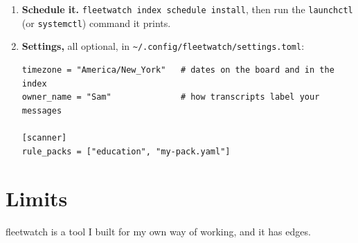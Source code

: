 \documentclass[11pt, letterpaper]{article}
\newenvironment{code}{\par\smallskip\small}{\par\smallskip}
\newcommand{\cmd}[1]{\texttt{#1}}
\begin{document}
\begin{enumerate}
    The first \cmd{index add} creates the registry with its group. A second group is declared
    by hand, in \cmd{\textasciitilde/.config/fleetwatch/indexes/registry.yaml}:
\begin{code}
\begin{verbatim}
groups:
  work:     {readers: [work]}
  personal: {readers: [personal, work]}
\end{verbatim}
\end{code}
  \item \textbf{Schedule it.} \cmd{fleetwatch index schedule install}, then run the
    \cmd{launchctl} (or \cmd{systemctl}) command it prints.
  \item \textbf{Settings,} all optional, in \cmd{\textasciitilde/.config/fleetwatch/settings.toml}:
\begin{code}
\begin{verbatim}
timezone = "America/New_York"   # dates on the board and in the index
owner_name = "Sam"              # how transcripts label your messages

[scanner]
rule_packs = ["education", "my-pack.yaml"]
\end{verbatim}
\end{code}
\end{enumerate}

\section{Limits}

fleetwatch is a tool I built for my own way of working, and it has edges.
\end{document}
